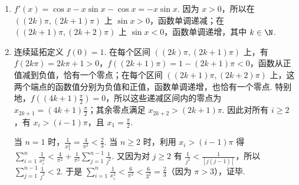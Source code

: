 \begin{solution}
\begin{enumerate}
\item \(f'(x)=\cos x-x\sin x-\cos x=-x\sin x\). 因为 \(x>0\)，所以在 \(((2k)\pi,(2k+1)\pi)\) 上 \(\sin x>0\)，函数单调递减；在 \(((2k+1)\pi,(2k+2)\pi)\) 上 \(\sin x<0\)，函数单调递增，其中 \(k\in\N\).
\item 连续延拓定义 \(f(0)=1\). 在每个区间 \(((2k)\pi,(2k+1)\pi)\) 上，有 \(f(2k\pi)=2k\pi+1>0\)，\(f((2k+1)\pi)=1-(2k+1)\pi<0\)，函数从正值减到负值，恰有一个零点；在每个区间 \(((2k+1)\pi,(2k+2)\pi)\) 上，这两个端点的函数值分别为负值和正值，函数单调递增，也恰有一个零点. 特别地，\(f((4k+1)\frac{\pi}{2})=0\)，所以这些递减区间内的零点为 \(x_{2k+1}=(4k+1)\frac{\pi}{2}\)；其余零点满足 \(x_{2k+2}>(2k+1)\pi\). 因此对所有 \(i\geqslant2\)，有 \(x_i>(i-1)\pi\)，且 \(x_1=\frac{\pi}{2}\).

当 \(n=1\) 时，\(\frac{1}{x_1^2}=\frac{4}{\pi^2}<\frac{2}{3}\). 当 \(n\geqslant2\) 时，利用 \(x_i>(i-1)\pi\) 得 \(\displaystyle\sum_{i=1}^{n}\frac1{x_i^2}<\frac4{\pi^2}+\frac1{\pi^2}\sum_{j=1}^{n-1}\frac1{j^2}\). 又因为对 \(j\geqslant2\) 有 \(\frac{1}{j^2}<\frac{1}{[j(j-1)]}\)，所以 \(\sum_{j=1}^{n-1}\frac{1}{j^2}<2\). 于是 \(\displaystyle\sum_{i=1}^{n}\frac1{x_i^2}<\frac6{\pi^2}<\frac6{3^2}=\frac23\)（因为 \(\pi>3\)），证毕.
\end{enumerate}
\end{solution}
